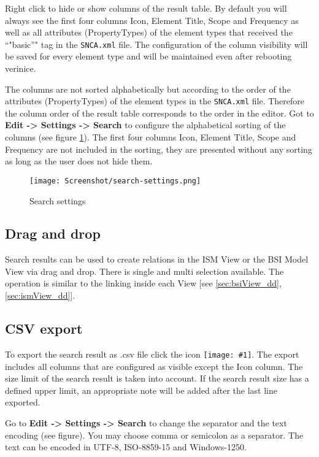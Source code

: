 \documentclass[a4paper,10pt]{book}
\newcommand{\icon}[1]{\texttt{[image: \#1]}}
\begin{document}
Right click to hide or show columns of the result table. By default
you will always see the first four columns Icon, Element Title, Scope
and Frequency as well as all attributes (PropertyTypes) of the element
types that received the ``"basic''" tag in the \texttt{SNCA.xml}
file. The configuration of the column visibility will be saved for
every element type and will be maintained even after rebooting
verinice.

The columns are not sorted alphabetically but according to the order
of the attributes (PropertyTypes) of the element types in the
\texttt{SNCA.xml} file. Therefore the column order of the result table
corresponds to the order in the editor. Got to \textbf{Edit ->
  Settings -> Search} to configure the alphabetical sorting of the
columns (see figure \ref{fig:search-settings}). The first four columns
Icon, Element Title, Scope and Frequency are not included in the
sorting, they are presented without any sorting as long as the user
does not hide them.


\begin{figure}[h]
  \centering
  \texttt{[image: Screenshot/search-settings.png]}
  \caption{Search settings}
  \label{fig:search-settings}
\end{figure}


\subsection{Drag and drop}
Search results can be used to create relations in the ISM View or the BSI Model
View via drag and drop. There is single and multi selection
available. The operation is similar to the linking inside each View [see
\ref{sec:bsiView_dd}, \ref{sec:ismView_dd}].

\subsection{CSV export}
\label{sec:csv-export}

To export the search result as .csv file click the
icon \icon{Icon/Export.png}. The export
includes all columns that are configured as visible except the Icon
column. The size limit of the search result is taken into account. If
the search result size has a defined upper limit, an appropriate note
will be added after the last line exported.

Go to \textbf{Edit -> Settings -> Search} to change the separator and
the text encoding (see figure). You may choose comma or semicolon as a
separator. The text can be encoded in UTF-8, ISO-8859-15 and
Windows-1250.
\end{document}
